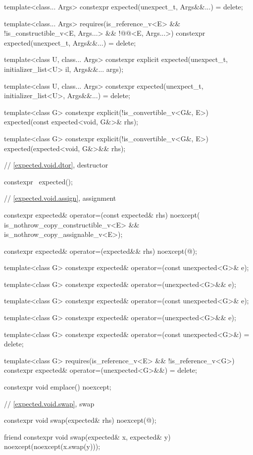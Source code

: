 \begin{codeblock}
{{    template<class... Args> constexpr expected(unexpect_t, Args&&...) = delete;

    template<class... Args>
      requires(is_reference_v<E> && !is_constructible_v<E, Args...> &&
               !@@<E, Args...>)
    constexpr expected(unexpect_t, Args&&...) = delete;

    template<class U, class... Args>
    constexpr explicit expected(unexpect_t, initializer_list<U> il, Args&&... args);

    template<class U, class... Args>
    constexpr expected(unexpect_t, initializer_list<U>, Args&&...) = delete;

    template<class G>
    constexpr explicit(!is_convertible_v<G&, E>)
        expected(const expected<void, G&>& rhs);

    template<class G>
    constexpr explicit(!is_convertible_v<G&, E>) expected(expected<void, G&>&& rhs);

    // \ref{expected.void.dtor}, destructor

    constexpr ~expected();

    // \ref{expected.void.assign}, assignment

    constexpr expected& operator=(const expected& rhs) noexcept(
        is_nothrow_copy_constructible_v<E> && is_nothrow_copy_assignable_v<E>);

    constexpr expected& operator=(expected&& rhs) noexcept(@\seebelow@);

    template<class G> constexpr expected& operator=(const unexpected<G>& e);

    template<class G> constexpr expected& operator=(unexpected<G>&& e);

    template<class G> constexpr expected& operator=(const unexpected<G>& e);

    template<class G> constexpr expected& operator=(unexpected<G>&& e);

    template<class G> constexpr expected& operator=(const unexpected<G>&) = delete;

    template<class G>
      requires(is_reference_v<E> && !is_reference_v<G>)
    constexpr expected& operator=(unexpected<G>&&) = delete;

    constexpr void emplace() noexcept;

    // \ref{expected.void.swap}, swap

    constexpr void swap(expected& rhs) noexcept(@\seebelow@);

    friend constexpr void swap(expected& x, expected& y) noexcept(noexcept(x.swap(y)));

}}
\end{codeblock}
